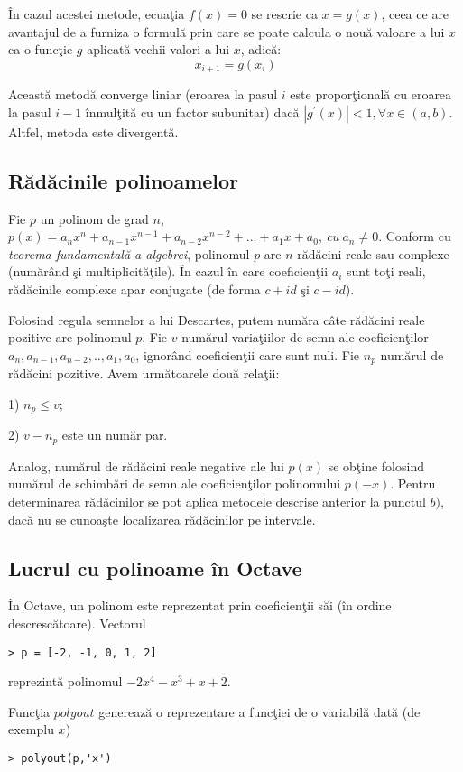 \documentclass{exam}
\begin{document}
În cazul acestei metode, ecuaţia $f(x)=0$ se rescrie ca $x=g(x)$, ceea ce are avantajul de a furniza o formulă prin care se poate calcula o nouă valoare a lui $x$ ca o funcţie $g$ aplicată vechii valori a lui $x$, adică:
$$x_{i+1}=g(x_{i})$$

Această metodă converge liniar (eroarea la pasul $i$ este proporţională cu eroarea la pasul $i-1$ înmulţită cu un factor subunitar) dacă $\left |g^{'}(x)  \right |<1,  \forall x\in (a,b)$. Altfel, metoda este divergentă.
\subsection{Rădăcinile polinoamelor}

Fie $p$ un polinom de grad $n$, $p(x)= a_{n}x^{n}+a_{n-1}x^{n-1}+a_{n-2}x^{n-2}+...+a_{1}x+a_{0}, \: cu \: a_{n}\neq 0$.
Conform cu \textit{teorema fundamentală a algebrei}, polinomul $p$ are $n$ rădăcini reale sau complexe (numărând şi multiplicităţile). În cazul în care coeficienţii $a_{i}$ sunt toţi reali,  rădăcinile complexe apar conjugate (de forma $c+id$ şi $c-id$).

Folosind regula semnelor a lui Descartes, putem număra câte rădăcini reale pozitive are polinomul $p$. Fie $v$ numărul variaţiilor de semn ale coeficienţilor $a_{n}, a_{n-1}, a_{n-2},.., a_{1},a_{0}$, ignorând coeficienţii care sunt nuli. Fie $n_{p}$ numărul de rădăcini pozitive. Avem următoarele două relaţii:

1) $n_{p}\leq v;$

2) $v-n_{p}$ este un număr par.

Analog, numărul de rădăcini reale negative ale lui $p(x)$ se obţine folosind numărul de schimbări de semn ale coeficienţilor polinomului  $p(-x)$.
Pentru determinarea rădăcinilor se pot aplica metodele descrise anterior la punctul $b)$, dacă nu se cunoaşte localizarea rădăcinilor pe intervale.


\subsection{Lucrul cu polinoame în Octave}

În Octave, un polinom este reprezentat prin coeficienţii săi (în ordine descrescătoare). Vectorul
\begin{verbatim}
> p = [-2, -1, 0, 1, 2]
\end{verbatim}

\noindent  reprezintă polinomul $-2x^{4}-x^{3}+x+2.$

Funcţia $polyout$ generează o reprezentare a funcţiei de o variabilă dată (de exemplu $x$)
\begin{verbatim}
> polyout(p,'x')
\end{verbatim}
\end{document}
